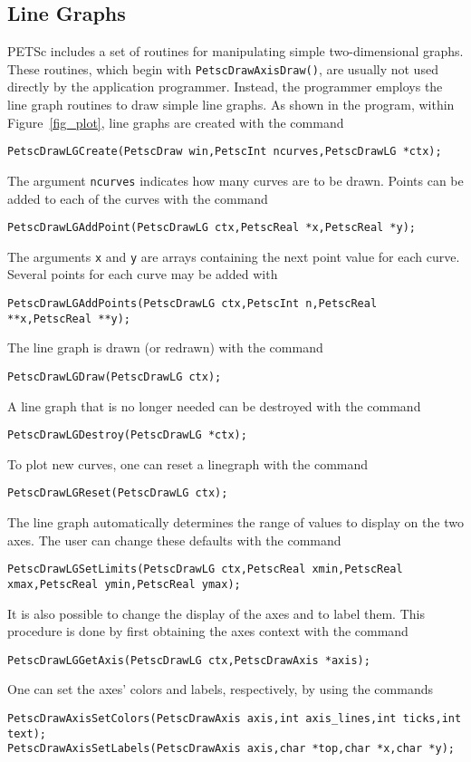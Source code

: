 {{\subsection{Line Graphs}
PETSc includes a set of routines for manipulating simple two-dimensional
graphs. These routines, which begin with \lstinline{PetscDrawAxisDraw()}, are usually
not used directly by the application programmer.  Instead, the programmer
employs the line graph routines to draw simple line graphs.
As shown in the program, within Figure~\ref{fig_plot}, line graphs
are created with the command  
\begin{lstlisting}
PetscDrawLGCreate(PetscDraw win,PetscInt ncurves,PetscDrawLG *ctx);
\end{lstlisting}
The argument \lstinline{ncurves} indicates how many curves are to be drawn.
Points can be added to each of the curves with the
command
\begin{lstlisting}
PetscDrawLGAddPoint(PetscDrawLG ctx,PetscReal *x,PetscReal *y);
\end{lstlisting}
The arguments \lstinline{x} and \lstinline{y} are arrays containing the next
point value for each curve.
Several points for each curve may be added with
\begin{lstlisting}
PetscDrawLGAddPoints(PetscDrawLG ctx,PetscInt n,PetscReal **x,PetscReal **y);
\end{lstlisting}

The line graph is drawn (or redrawn) with the command
\begin{lstlisting}
PetscDrawLGDraw(PetscDrawLG ctx);
\end{lstlisting}
A line graph that is no longer needed can be destroyed with the
command
\begin{lstlisting}
PetscDrawLGDestroy(PetscDrawLG *ctx);
\end{lstlisting}
To plot new curves, one can reset a linegraph with the
command
\begin{lstlisting}
PetscDrawLGReset(PetscDrawLG ctx);
\end{lstlisting}
The line graph automatically determines the range of values to
display on the two axes.  The user can change these defaults with the
command
\begin{lstlisting}
PetscDrawLGSetLimits(PetscDrawLG ctx,PetscReal xmin,PetscReal xmax,PetscReal ymin,PetscReal ymax);
\end{lstlisting}

It is also possible to change the display of the axes and to label
them. This procedure is done by first obtaining the axes context with the
command  
\begin{lstlisting}
PetscDrawLGGetAxis(PetscDrawLG ctx,PetscDrawAxis *axis);
\end{lstlisting}
One can set the axes' colors and labels, respectively, by using the
commands
\begin{lstlisting}
PetscDrawAxisSetColors(PetscDrawAxis axis,int axis_lines,int ticks,int text);
PetscDrawAxisSetLabels(PetscDrawAxis axis,char *top,char *x,char *y);
\end{lstlisting}

}}
